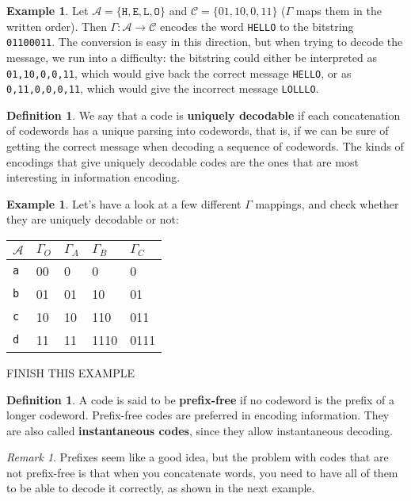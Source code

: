 \documentclass{report}
\theoremstyle{plain}
\theoremstyle{definition}
\newtheorem{exmp}[thm]{Example}
\newtheorem{defn}[thm]{Definition}
\theoremstyle{remark}
\newtheorem*{remark}{Remark}
\begin{document}
\begin{exmp}
 Let $\mathcal A = \{\texttt H, \texttt E, \texttt L, \texttt O\}$ and $\mathcal C = \{01, 10, 0, 11\}$ ($\Gamma$ maps them in the written order). Then $\Gamma : \mathcal A \to \mathcal C$ encodes the word \texttt{HELLO} to the bitstring \texttt{01100011}. The conversion is easy in this direction, but when trying to decode the message, we run into a difficulty: the bitstring could either be interpreted as \texttt{01,10,0,0,11}, which would give back the correct message \texttt{HELLO}, or as \texttt{0,11,0,0,0,11}, which would give the incorrect message \texttt{LOLLLO}.
\end{exmp}

\begin{defn}
	We say that a code is \textbf{uniquely decodable} if each concatenation of codewords has a unique parsing into codewords, that is, if we can be sure of getting the correct message when decoding a sequence of codewords. The kinds of encodings that give uniquely decodable codes are the ones that are most interesting in information encoding. 
\end{defn}

\begin{exmp}
Let's have a look at a few different $\Gamma$ mappings, and check whether they are uniquely decodable or not:
\begin{center}
	\begin{tabular}{l | l l l l}
		$\mathcal A$ & $\Gamma_O$ & $\Gamma_A$ & $\Gamma_B$ & $\Gamma_C$ \\ \hline
		\texttt a & 00 & 0 & 0 & 0 \\
		\texttt b & 01 & 01 & 10 & 01 \\
		\texttt c & 10 & 10 & 110 & 011 \\
		\texttt d & 11 & 11 & 1110 & 0111
	\end{tabular}
\end{center}
FINISH THIS EXAMPLE
\end{exmp}

\begin{defn}
	A code is said to be \textbf{prefix-free} if no codeword is the prefix of a longer codeword. Prefix-free codes are preferred in encoding information. They are also called \textbf{instantaneous codes}, since they allow instantaneous decoding.
\end{defn}
\begin{remark} Prefixes seem like a good idea, but the problem with codes that are not prefix-free is that when you concatenate words, you need to have all of them to be able to decode it correctly, as shown in the next example.
\end{remark}
\end{document}
